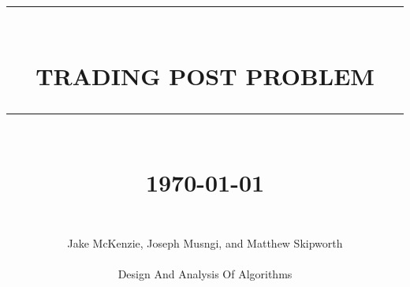 \documentclass[12pt]{report}
\newcommand{\HRule}[1]{\rule{\linewidth}{#1}}
\begin{document}
\title{ \normalsize \textsc{}
		\\ [2.0cm]
		\HRule{0.5pt} \\
		\LARGE \textbf{\uppercase{Trading Post Problem}}
		\HRule{2pt} \\ [0.5cm]
		\normalsize \today \vspace*{5\baselineskip}}

\date{}

\author{
		 \\ 
		Jake McKenzie, Joseph Musngi, and Matthew Skipworth \\ \\
		Design And Analysis Of Algorithms }

\maketitle
\tableofcontents

\newpage

\sectionfont{\scshape}

\end{document}
